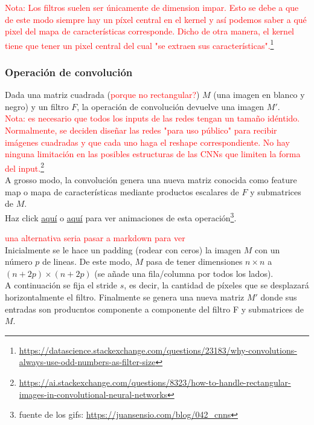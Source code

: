 \documentclass{article}
\begin{document}
\textcolor{red}{Nota: Los filtros suelen ser únicamente de dimension impar. Esto se debe a que de este modo siempre hay un píxel central en el kernel y así podemos saber a qué pixel del mapa de características corresponde. Dicho de otra manera, el kernel tiene que tener un pixel central del cual "se extraen sus características".\footnote{\url{https://datascience.stackexchange.com/questions/23183/why-convolutions-always-use-odd-numbers-as-filter-size}}}


\subsubsection{Operación de convolución}
Dada una matriz cuadrada (\textcolor{red}{porque no rectangular?}) $M$ (una imagen en blanco y negro) y un filtro $F$, la operación de convolución devuelve una imagen $M'$.\\

\textcolor{red}{Nota: es necesario que todos los inputs de las redes tengan un tamaño idéntido. Normalmente, se deciden diseñar las redes "para uso público" para recibir imágenes cuadradas y que cada uno haga el reshape correspondiente. No hay ninguna limitación en las posibles estructuras de las CNNs que limiten la forma del input.\footnote{\url{https://ai.stackexchange.com/questions/8323/how-to-handle-rectangular-images-in-convolutional-neural-networks}}}\\

A grosso modo, la convolución genera una nueva matriz conocida como feature map o mapa de características mediante productos escalares de $F$ y submatrices de $M$.\\


Haz click \href{https://miro.medium.com/max/1052/1*GcI7G-JLAQiEoCON7xFbhg.gif}{aquí} o \href{https://cdn-media-1.freecodecamp.org/images/gb08-2i83P5wPzs3SL-vosNb6Iur5kb5ZH43}{aquí} para ver animaciones de esta operación\footnote{fuente de los gifs: \url{https://juansensio.com/blog/042_cnns}}.

\textcolor{red}{una alternativa seria pasar a markdown para ver }\\

Inicialmente se le hace un padding (rodear con ceros) la imagen $M$ con un número $p$ de lineas. De este modo, $M$ pasa de tener dimensiones $n\times n$ a $(n+2p)\times (n+2p) $ (se añade una fila/columna por todos los lados).\\

A continuación se fija el stride $s$, es decir, la cantidad de píxeles que se desplazará horizontalmente el filtro. Finalmente se genera una nueva matriz $M'$ donde sus entradas son producntos componente a componente del filtro F y submatrices de $M$.\\
\end{document}
